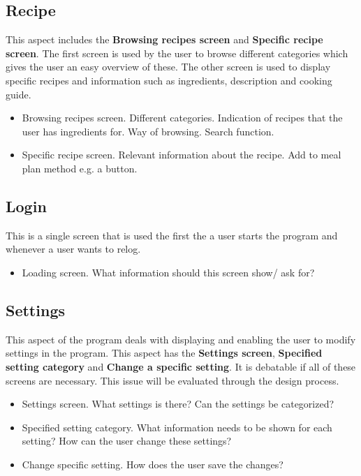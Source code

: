 \subsection{Recipe}
This aspect includes the \textbf{Browsing recipes screen} and \textbf{Specific recipe screen}. The first screen is used by the user to browse different categories which gives the user an easy overview of these. The other screen is used to display specific recipes and information such as ingredients, description and cooking guide.

\begin{itemize}
	\item Browsing recipes screen.
		\subitem Different categories. 
		\subitem Indication of recipes that the user has ingredients for.
		\subitem Way of browsing.
		\subitem Search function.
	\item Specific recipe screen.
		\subitem Relevant information about the recipe.
		\subitem Add to meal plan method e.g. a button.
\end{itemize}

\subsection{Login}
This is a single screen that is used the first the a user starts the program and whenever a user wants to relog.

\begin{itemize}
	\item Loading screen.
		\subitem What information should this screen show/ ask for?
\end{itemize}

\subsection{Settings}
This aspect of the program deals with displaying and enabling the user to modify settings in the program. This aspect has the \textbf{Settings screen}, \textbf{Specified setting category} and \textbf{Change a specific setting}. It is debatable if all of these screens are necessary. This issue will be evaluated through the design process.

\begin{itemize}
	\item Settings screen. 
		\subitem What settings is there?
		\subitem Can the settings be categorized?
	\item Specified setting category.
		\subitem What information needs to be shown for each setting?
		\subitem How can the user change these settings?
	\item Change specific setting.
		\subitem How does the user save the changes?
\end{itemize}  

